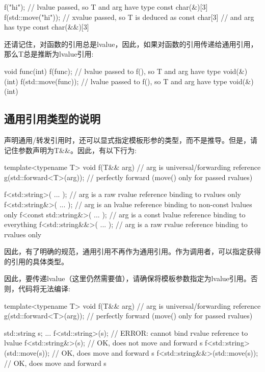 \begin{cppcode}
f("hi"); // lvalue passed, so T and arg have type const char(&)[3]
f(std::move("hi")); // xvalue passed, so T is deduced as const char[3]
// and arg has type const char(&&)[3]
\end{cppcode}

还请记住，对函数的引用总是lvalue，因此，如果对函数的引用传递给通用引用，那么T总是推断为lvalue引用:

\begin{cppcode}
void func(int) {
}
f(func); // lvalue passed to f(), so T and arg have type void(&)(int)
f(std::move(func)); // lvalue passed to f(), so T and arg have type void(&)(int)
\end{cppcode}

\subsection{通用引用类型的说明}

声明通用/转发引用时，还可以显式指定模板形参的类型，而不是推导。但是，请记住参数声明为T\&\&。因此，有以下行为:

\begin{cppcode}
template<typename T>
void f(T&& arg) // arg is universal/forwarding reference
{
	g(std::forward<T>(arg)); // perfectly forward (move() only for passed rvalues)
}

f<std::string>( ... ); // arg is a raw rvalue reference binding to rvalues only
f<std::string&>( ... ); // arg is an lvalue reference binding to non-const lvalues only
f<const std::string&>( ... ); // arg is a const lvalue reference binding to everything
f<std::string&&>( ... ); // arg is a raw rvalue reference binding to rvalues only
\end{cppcode}

因此，有了明确的规范，通用引用不再作为通用引用。作为调用者，可以指定获得的引用的具体类型。

因此，要传递lvalue（这里仍然需要值），请确保将模板参数指定为lvalue引用。否则，代码将无法编译:

\begin{cppcode}
template<typename T>
void f(T&& arg) // arg is universal/forwarding reference
{
	g(std::forward<T>(arg)); // perfectly forward (move() only for passed rvalues)
}

std::string s;
...
f<std::string>(s); // ERROR: cannot bind rvalue reference to lvalue
f<std::string&>(s); // OK, does not move and forward s
f<std::string>(std::move(s)); // OK, does move and forward s
f<std::string&&>(std::move(s)); // OK, does move and forward s
\end{cppcode}

